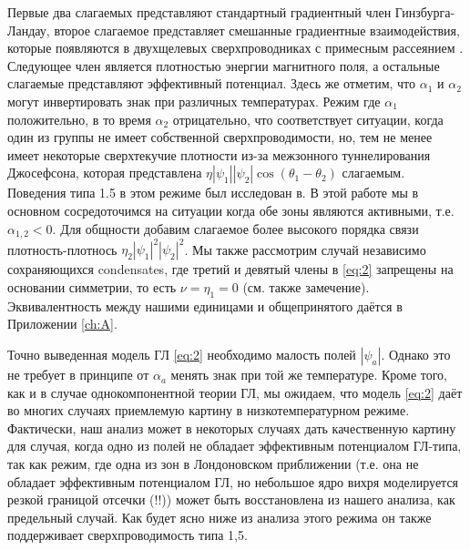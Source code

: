 Первые два слагаемых представляют стандартный градиентный член 
Гинзбурга-Ландау, второе слагаемое представляет смешанные градиентные 
взаимодействия, которые появляются в двухщелевых сверхпроводниках с примесным 
рассеянием \cite{bib:8,bib:9}. Следующее член является плотностью энергии 
магнитного поля, а остальные слагаемые представляют эффективный потенциал. 
Здесь же отметим, что \( \alpha_1 \) и \( \alpha_2 \) могут инвертировать знак 
при различных температурах. Режим где \( \alpha_1 \) положительно, в то время 
\( \alpha_2 \) отрицательно, что соответствует ситуации, когда один из группы 
не имеет собственной сверхпроводимости, но, тем не менее имеет некоторые 
сверхтекучие плотности из-за межзонного туннелирования Джосефсона, которая 
представлена \( \eta|\psi_1||\psi_2|\cos(\theta_1-\theta_2) \) слагаемым. 
Поведения типа 1.5 в этом режиме был исследован в\cite{bib:2}. В этой работе 
мы в основном сосредоточимся на ситуации когда обе зоны являются активными, 
т.е. \( \alpha_{1,2} < 0 \). Для общности добавим слагаемое более высокого 
порядка связи плотность-плотнось \( \eta_2|\psi_1|^2|\psi_2|^2 \). Мы также 
рассмотрим случай независимо сохраняющихся condensates, где третий и девятый 
члены в \eqref{eq:2} запрещены на основании симметрии, то есть 
\( \nu = \eta_1 = 0 \) (см. также замечение\cite{bib:21}). Эквивалентность 
между нашими единицами и общепринятого даётся в Приложении \ref{ch:A}.

Точно выведенная модель ГЛ \eqref{eq:2} необходимо малость полей \( |\psi_a| \). 
Однако это не требует в принципе от \( \alpha_a \) менять знак при той же 
температуре. Кроме того, как и в случае однокомпонентной теории ГЛ, мы 
ожидаем, что модель \eqref{eq:2} даёт во многих случаях приемлемую картину в 
низкотемпературном режиме. Фактически, наш анализ может в некоторых случаях 
дать качественную картину для случая, когда одно из полей не обладает 
эффективным потенциалом ГЛ-типа, так как режим, где одна из зон в Лондоновском 
приближении (т.е. она не обладает эффективным потенциалом ГЛ, но небольшое ядро 
вихря моделируется резкой границой отсечки (!!)) может быть восстановлена из 
нашего анализа, как предельный случай. Как будет ясно ниже из анализа этого 
режима он также поддерживает сверхпроводимость типа 1,5.

